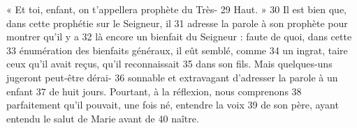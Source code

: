 « Et toi, enfant, on t'appellera prophète du Très-	 
29	 	Haut. »	 
30	 	Il est bien que, dans cette prophétie sur le Seigneur, il	 
31	 	adresse la parole à son prophète pour montrer qu'il y a	 
32	 	là encore un bienfait du Seigneur : faute de quoi, dans cette	 
33	 	énumération des bienfaits généraux, il eût semblé, comme	 
34	 	un ingrat, taire ceux qu'il avait reçus, qu'il reconnaissait	 
35	 	dans son fils. Mais quelques-uns jugeront peut-être dérai-	 
36	 	sonnable et extravagant d'adresser la parole à un enfant	 
37	 	de huit jours. Pourtant, à la réflexion, nous comprenons	 
38	 	parfaitement qu'il pouvait, une fois né, entendre la voix	 
39	 	de son père, ayant entendu le salut de Marie avant de	 
40	 	naître.